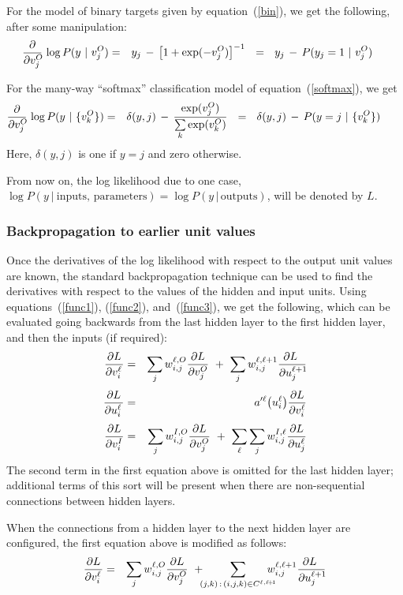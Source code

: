 \documentclass{report}[11pt]
\def\beq{\begin{eqnarray}}
\def\eeq{\end{eqnarray}}
\def\eep{\end{eqnarray}}
\begin{document}
For the model of binary targets given by equation~(\ref{bin}), we
get the following, after some manipulation:\beq
  {\partial \over \partial v^O_j\!}\, \log P(y\ |\ v^O_j) & = &
    y_j\, -\, \big[ 1 + \exp(-v^O_j) \big]^{-1}\ 
    \ =\ \ y_j \,-\, P(y_j=1\ |\ v^O_j)\ \ \ \
\label{bind}\eep

For the many-way ``softmax'' classification model of equation~(\ref{softmax}),
we get\beq
  {\partial \over \partial v^O_j\!}\, \log P(y\ |\ \{v^O_k\}) & = &
    \delta(y,j)\, -\, {\exp(v^O_j) \over \sum\limits_k \exp(v^O_k)}
    \ \ =\ \ \delta(y,j)\, -\, P(y=j\ |\ \{v^O_k\})\ \ \ \ \ \
\label{classd}\eeq%
Here, $\delta(y,j)$ is one if $y=j$ and zero otherwise.  

From now on, the log likelihood due to one case, $\log P(y\ |\
\mbox{inputs},\,\mbox{parameters}) = \log P(y\,|\,\mbox{outputs})$,
will be denoted by $L$.

\subsubsection*{Backpropagation to earlier unit values}

Once the derivatives of the log likelihood with respect to the output
unit values are known, the standard backpropagation technique can be
used to find the derivatives with respect to the values of the hidden
and input units.  Using equations~(\ref{func1}), (\ref{func2}),
and~(\ref{func3}), we get the following, which can be evaluated going
backwards from the last hidden layer to the first hidden layer, and
then the inputs (if required):\beq
  {\partial L \over \partial v^{\ell}_{i\ }\!} & = & 
    \sum_j w^{\ell,O}_{i,j} {\partial L \over \partial v^O_j} \ +\
    \sum_j w^{\ell,\ell+1}_{i,j} {\partial L\ \over \partial u^{\ell+1}_j\! }
    \\[3pt]
  {\partial L \over \partial u^{\ell}_{i\ }\!} & = & 
   a'^{\ell}\big(u^{\ell}_i\big) {\partial L \over \partial v^{\ell}_i } 
   \label{aderiv}\\[3pt]
  {\partial L \over \partial v^I_{i\ }\!} & = & 
    \sum_j w^{I,O}_{i,j} {\partial L \over \partial v^O_j}\ +\
    \sum_{\ell} \sum_j w^{I,\ell}_{i,j} {\partial L \over \partial u^{\ell}_j }
\eeq%
The second term in the first equation above is omitted for the last
hidden layer; additional terms of this sort will be present when there
are non-sequential connections between hidden layers.  

When the connections from a hidden layer to the next hidden layer are
configured, the first equation above is modified as follows:\beq
  {\partial L \over \partial v^{\ell}_{i\ }\!} & = & 
    \sum_j w^{\ell,O}_{i,j} {\partial L \over \partial v^O_j} \ +\!\!\!
   \sum_{(j,k)\,:\, (i,j,k)\in C^{\ell,\ell\!+\!1}}\!\!\!\!\!\!    
     w^{\ell,\ell+1}_{i,j} {\partial L\ \over \partial u^{\ell+1}_j\! }
\eeq
\end{document}
